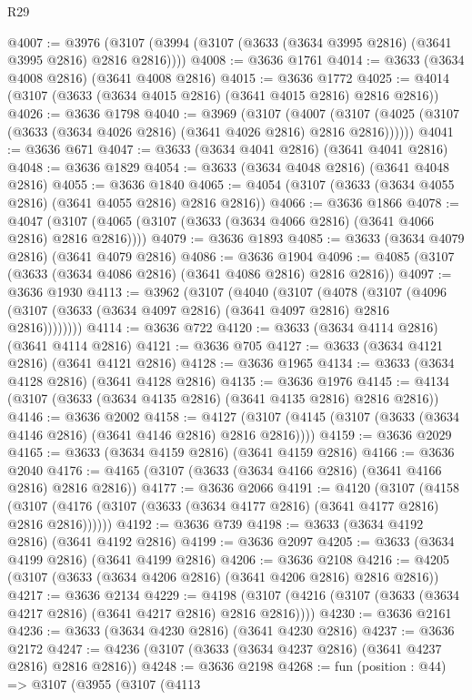 \begin{lexlean}{R29}
\begin{coremodule}
@4007 := @3976 (@3107 (@3994 (@3107 (@3633 (@3634 @3995 @2816) (@3641 @3995 @2816) @2816 @2816))))
@4008 := @3636 @1761
@4014 := @3633 (@3634 @4008 @2816) (@3641 @4008 @2816)
@4015 := @3636 @1772
@4025 := @4014 (@3107 (@3633 (@3634 @4015 @2816) (@3641 @4015 @2816) @2816 @2816))
@4026 := @3636 @1798
@4040 := @3969
    (@3107
      (@4007 (@3107 (@4025 (@3107 (@3633 (@3634 @4026 @2816) (@3641 @4026 @2816) @2816 @2816))))))
@4041 := @3636 @671
@4047 := @3633 (@3634 @4041 @2816) (@3641 @4041 @2816)
@4048 := @3636 @1829
@4054 := @3633 (@3634 @4048 @2816) (@3641 @4048 @2816)
@4055 := @3636 @1840
@4065 := @4054 (@3107 (@3633 (@3634 @4055 @2816) (@3641 @4055 @2816) @2816 @2816))
@4066 := @3636 @1866
@4078 := @4047 (@3107 (@4065 (@3107 (@3633 (@3634 @4066 @2816) (@3641 @4066 @2816) @2816 @2816))))
@4079 := @3636 @1893
@4085 := @3633 (@3634 @4079 @2816) (@3641 @4079 @2816)
@4086 := @3636 @1904
@4096 := @4085 (@3107 (@3633 (@3634 @4086 @2816) (@3641 @4086 @2816) @2816 @2816))
@4097 := @3636 @1930
@4113 := @3962
    (@3107
      (@4040
        (@3107
          (@4078
            (@3107 (@4096 (@3107 (@3633 (@3634 @4097 @2816) (@3641 @4097 @2816) @2816 @2816))))))))
@4114 := @3636 @722
@4120 := @3633 (@3634 @4114 @2816) (@3641 @4114 @2816)
@4121 := @3636 @705
@4127 := @3633 (@3634 @4121 @2816) (@3641 @4121 @2816)
@4128 := @3636 @1965
@4134 := @3633 (@3634 @4128 @2816) (@3641 @4128 @2816)
@4135 := @3636 @1976
@4145 := @4134 (@3107 (@3633 (@3634 @4135 @2816) (@3641 @4135 @2816) @2816 @2816))
@4146 := @3636 @2002
@4158 := @4127 (@3107 (@4145 (@3107 (@3633 (@3634 @4146 @2816) (@3641 @4146 @2816) @2816 @2816))))
@4159 := @3636 @2029
@4165 := @3633 (@3634 @4159 @2816) (@3641 @4159 @2816)
@4166 := @3636 @2040
@4176 := @4165 (@3107 (@3633 (@3634 @4166 @2816) (@3641 @4166 @2816) @2816 @2816))
@4177 := @3636 @2066
@4191 := @4120
    (@3107
      (@4158 (@3107 (@4176 (@3107 (@3633 (@3634 @4177 @2816) (@3641 @4177 @2816) @2816 @2816))))))
@4192 := @3636 @739
@4198 := @3633 (@3634 @4192 @2816) (@3641 @4192 @2816)
@4199 := @3636 @2097
@4205 := @3633 (@3634 @4199 @2816) (@3641 @4199 @2816)
@4206 := @3636 @2108
@4216 := @4205 (@3107 (@3633 (@3634 @4206 @2816) (@3641 @4206 @2816) @2816 @2816))
@4217 := @3636 @2134
@4229 := @4198 (@3107 (@4216 (@3107 (@3633 (@3634 @4217 @2816) (@3641 @4217 @2816) @2816 @2816))))
@4230 := @3636 @2161
@4236 := @3633 (@3634 @4230 @2816) (@3641 @4230 @2816)
@4237 := @3636 @2172
@4247 := @4236 (@3107 (@3633 (@3634 @4237 @2816) (@3641 @4237 @2816) @2816 @2816))
@4248 := @3636 @2198
@4268 := fun (position : @44) =>
  @3107
    (@3955
      (@3107
        (@4113

\end{coremodule}
\end{lexlean}
